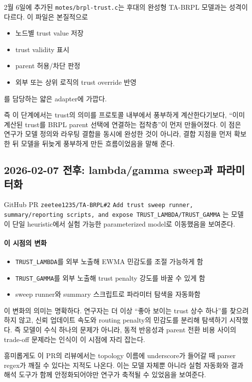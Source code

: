 \documentclass[12pt,a4paper]{article}
\begin{document}
2월 6일에 추가된 \texttt{motes/brpl-trust.c}는 후대의 완성형 TA-BRPL 모델과는
성격이 다르다. 이 파일은 본질적으로
\begin{itemize}[leftmargin=1.5em]
\item 노드별 trust value 저장
\item trust validity 표시
\item parent 허용/차단 판정
\item 외부 또는 상위 로직의 trust override 반영
\end{itemize}
를 담당하는 얇은 adapter에 가깝다.

즉 이 단계에서는 trust의 의미를 프로토콜 내부에서 풍부하게 계산한다기보다,
``이미 계산된 trust를 BRPL parent 선택에 연결하는 접착층''이 먼저 만들어졌다.
이 점은 연구가 모델 정의와 라우팅 결합을 동시에 완성한 것이 아니라,
결합 지점을 먼저 확보한 뒤 모델을 뒤늦게 풍부하게 만든 흐름이었음을 말해 준다.

\subsection{2026-02-07 전후: lambda/gamma sweep과 파라미터화}

GitHub PR \texttt{zeetee1235/TA-BRPL\#2}
\texttt{Add trust sweep runner, summary/reporting scripts, and expose TRUST\_LAMBDA/TRUST\_GAMMA}
는 모델이 단일 heuristic에서 실험 가능한 parameterized model로 이동했음을 보여준다.

\paragraph{이 시점의 변화}
\begin{itemize}[leftmargin=1.5em]
\item \texttt{TRUST\_LAMBDA}를 외부 노출해 EWMA 민감도를 조절 가능하게 함
\item \texttt{TRUST\_GAMMA}를 외부 노출해 trust penalty 강도를 바꿀 수 있게 함
\item sweep runner와 summary 스크립트로 파라미터 탐색을 자동화함
\end{itemize}

이 변화의 의미는 명확하다. 연구자는 더 이상
``좋아 보이는 trust 상수 하나''를 찾으려 하지 않고,
신뢰 업데이트 속도와 routing penalty의 민감도를 분리해 탐색하기 시작했다.
즉 모델이 수식 하나의 문제가 아니라, 동적 반응성과 parent 전환 비용 사이의
trade-off 문제라는 인식이 이 시점에 자리 잡는다.

흥미롭게도 이 PR의 리뷰에서는 topology 이름에 underscore가 들어갈 때
parser regex가 깨질 수 있다는 지적도 나온다. 이는 모델 자체뿐 아니라
실험 자동화와 결과 해석 도구가 함께 안정화되어야만 연구가 축적될 수 있었음을
보여준다.
\end{document}
